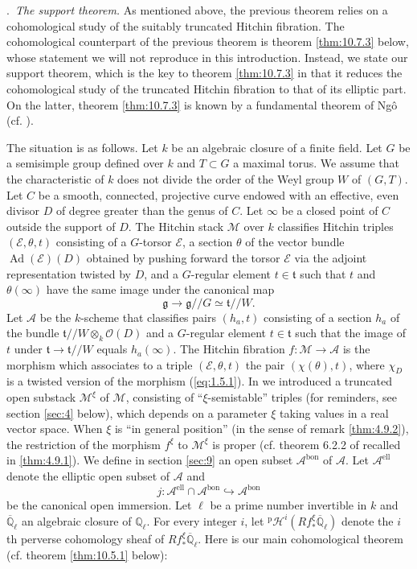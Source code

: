 \documentclass[12pt,a4paper,oneside,english,leqno]{smfart}
\makeatletter
\numberwithin{equation}{subsection}
\newcounter{theo}
\numberwithin{theo}{subsection}
\newenvironment{paragr}[1][]{\medskip\refstepcounter{subsection}%
  \par\noindent\hspace*{\parindent}\thesubsection.\ \emph{#1}%
  \@ifundefined{@empty}{}{}\ignorespaces}{\medskip}
\theoremstyle{plain}
\theoremstyle{definition}
\theoremstyle{remark}
\DeclareMathOperator{\Ad}{Ad}
\DeclareMathOperator{\el}{ell}
\newcommand{\Ql}{\mathbb{Q}_{\ell}}
\newcommand{\Qlb}{\overline{\mathbb{Q}}_{\ell}}
\newcommand{\oc}{\mathcal{O}}
\newcommand{\ec}{\mathcal{E}}
\newcommand{\mc}{\mathcal{M}}
\newcommand{\Ac}{\mathcal{A}}
\newcommand{\ggo}{\mathfrak{g}}
\newcommand{\tgo}{\mathfrak{t}}
\makeatother
\begin{document}
\begin{paragr}[The support theorem.]\label{S:1.5} As mentioned above, the previous theorem relies on a cohomological study of the suitably truncated Hitchin fibration. The cohomological counterpart of the previous theorem is theorem \ref{thm:10.7.3} below, whose statement we will not reproduce in this introduction. Instead, we state our support theorem, which is the key to theorem \ref{thm:10.7.3} in that it reduces the cohomological study of the truncated Hitchin fibration to that of its elliptic part. On the latter, theorem \ref{thm:10.7.3} is known by a fundamental theorem of Ng\^o (cf. \cite{Ngo-lemme}).

The situation is as follows. Let $k$ be an algebraic closure of a finite field. Let $G$ be a semisimple group defined over $k$ and $T\subset G$ a maximal torus. We assume that the characteristic of $k$ does not divide the order of the Weyl group $W$ of $(G,T)$. Let $C$ be a smooth, connected, projective curve endowed with an effective, even divisor $D$ of degree greater than the genus of $C$. Let $\infty$ be a closed point of $C$ outside the support of $D$. The Hitchin stack $\mc$ over $k$ classifies Hitchin triples $(\ec,\theta,t)$ consisting of a $G$-torsor $\ec$, a section $\theta$ of the vector bundle $\Ad(\ec)(D)$ obtained by pushing forward the torsor $\ec$ via the adjoint representation twisted by $D$, and a $G$-regular element $t\in \tgo$ such that $t$ and $\theta(\infty)$ have the same image under the canonical map
  \begin{equation}\label{eq:1.5.1}
    \ggo \to \ggo//G\simeq \tgo//W.
  \end{equation}
Let $\Ac$ be the $k$-scheme that classifies pairs $(h_a,t)$ consisting of a section $h_a$ of the bundle $\tgo//W \otimes_k \oc(D)$ and a $G$-regular element $t\in \tgo$ such that the image of $t$ under $\tgo \to \tgo//W$ equals $h_a(\infty)$. The Hitchin fibration $f : \mc \to \Ac$ is the morphism which associates to a triple $(\ec,\theta,t)$ the pair $(\chi(\theta),t)$, where $\chi_D$ is a twisted version of the morphism (\ref{eq:1.5.1}). In \cite{LFPI} we introduced a truncated open substack $\mc^\xi$ of $\mc$, consisting of “$\xi$-semistable” triples (for reminders, see section \ref{sec:4} below), which depends on a parameter $\xi$ taking values in a real vector space. When $\xi$ is “in general position” (in the sense of remark \ref{thm:4.9.2}), the restriction of the morphism $f^\xi$ to $\mc^\xi$ is proper (cf. theorem 6.2.2 of \cite{LFPI} recalled in \ref{thm:4.9.1}). We define in section \ref{sec:9} an open subset $\Ac^{\mathrm{bon}}$ of $\Ac$. Let $\Ac^{\el}$ denote the elliptic open subset of $\Ac$ and
$$j:\mathcal{A}^{\mathrm{ell}}\cap \mathcal{A}^{\mathrm{bon}} \hookrightarrow \mathcal{A}^{\mathrm{bon}}$$
be the canonical open immersion. Let $\ell$ be a prime number invertible in $k$ and $\Qlb$ an algebraic closure of $\Ql$. For every integer $i$, let ${}^{\mathrm{p}}\mathcal{H}^{i}(Rf_{\ast}^\xi \overline{\mathbb{Q}}_{\ell})$ denote the $i$th perverse cohomology sheaf of $Rf_{\ast}^\xi \overline{\mathbb{Q}}_{\ell}$. Here is our main cohomological theorem (cf. theorem \ref{thm:10.5.1} below):


\end{paragr}
\end{document}
